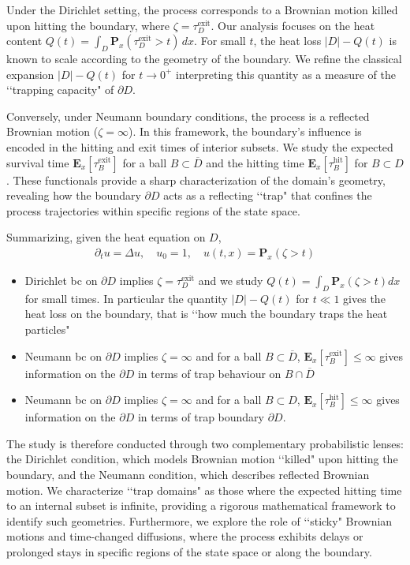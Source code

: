 \documentclass[[11pt,a4paper,reqno]{article}
\numberwithin{equation}{section}
\begin{document}
Under the Dirichlet setting, the process corresponds to a Brownian motion killed upon hitting the boundary, where $\zeta = \tau_{D}^{\text{exit}}$. Our analysis focuses on the heat content $Q(t) = \int_{D} \mathbf{P}_x(\tau_{D}^{\text{exit}} > t) \, dx$. 
For small $t$, the heat loss $|D| - Q(t)$ is known to scale according to the geometry of the boundary. 
We refine the classical expansion   $|D| - Q(t)$ for $t \to 0^+$ interpreting this quantity as a measure of the \lq\lq trapping capacity" of $\partial D.$ 


Conversely, under Neumann boundary conditions, the process is a reflected Brownian motion ($\zeta = \infty$).
 In this framework, the boundary's influence is encoded in the hitting and exit times of interior subsets.
 We study the expected survival time $\mathbf{E}_x[\tau_{B}^{\text{exit}}]$ for a ball $B \subset \overline{D}$ and the hitting time $\mathbf{E}_x[\tau_{B}^{\text{hit}}]$ for $B \subset D$.
    These functionals provide a sharp characterization of the domain's geometry, revealing how the boundary $\partial D$ acts as a reflecting \lq\lq trap" that confines the process trajectories within specific regions of the state space.




Summarizing,
given the heat equation on $D$,
\begin{align}
    \partial_t u = \Delta u, \quad u_0=1, \quad u(t,x) = \mathbf{P}_x(\zeta > t)
\end{align}
\begin{itemize}
    \item Dirichlet bc on $\partial D$ implies $\zeta=\tau^\text{exit}_D$ and we study $Q(t) = \int_D \mathbf{P}_x(\zeta > t) dx$ for small times. In particular  the quantity $|D| - Q(t)$ for  $t \ll 1$ gives the heat loss on the boundary, that is \lq\lq how much the boundary traps the heat particles"
    \item  Neumann bc on $\partial D$ implies $\zeta = \infty$ and for a ball $B \subset \overline{D}$,  $\mathbf{E}_x[\tau^\text{exit}_B] \leq \infty$ gives information on the $\partial D$ in terms of trap behaviour on $B \cap \overline{D}$
    \item  Neumann bc on $\partial D$ implies $\zeta = \infty$ and for a ball $B \subset D$,  $\mathbf{E}_x[\tau^\text{hit}_B] \leq \infty$ gives information on the $\partial D$ in terms of trap boundary $\partial D.$
\end{itemize}


The study is therefore conducted through two complementary probabilistic lenses: the Dirichlet condition, which models Brownian motion \lq\lq killed" upon hitting the boundary, and the Neumann condition, which describes reflected Brownian motion. We characterize \lq\lq trap domains" as those where the expected hitting time to an internal subset is infinite, providing a rigorous mathematical framework to identify such geometries. Furthermore, we explore the role of \lq\lq sticky" Brownian motions and time-changed diffusions, where the process exhibits delays or prolonged stays in specific regions of the state space or along the boundary.
\end{document}
